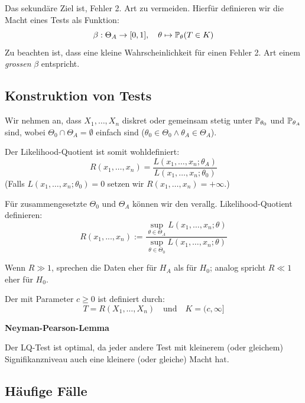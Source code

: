 Das sekundäre Ziel ist, Fehler 2. Art zu vermeiden. Hierfür definieren wir die Macht eines Tests als Funktion:
\[\beta : \Theta_A \to [0,1], \quad \theta \mapsto \P_\theta(T \in K)\]
Zu beachten ist, dass eine kleine Wahrscheinlichkeit für einen Fehler 2. Art einem \textit{grossen} \(\beta\) entspricht.

\subsection{Konstruktion von Tests}
Wir nehmen an, dass \(X_1, \ldots, X_n\) diskret oder gemeinsam stetig unter \(\P_{\theta_0}\) und \(\P_{\theta_A}\) sind, wobei \(\Theta_0 \cap \Theta_A = \emptyset\) einfach sind (\(\theta_0 \in \Theta_0 \land \theta_A \in \Theta_A\)).

\noindent Der Likelihood-Quotient ist somit wohldefiniert:
\[R(x_1, \ldots, x_n) = \frac{L(x_1,\ldots, x_n;\theta_A)}{L(x_1, \ldots, x_n;\theta_0)}\]
(Falls \(L(x_1, \ldots, x_n; \theta_0) = 0\) setzen wir \(R(x_1, \ldots, x_n) = +\infty\).) 

Für zusammengesetzte $\Theta_0$ und $\Theta_A$ können wir den verallg. Likelihood-Quotient definieren:
\[R(x_1, ..., x_n) := \frac{\sup_{\theta \in \Theta_A}L(x_1, \dots, x_n; \theta)}{\sup_{\theta \in \Theta_0}L(x_1, \dots, x_n; \theta)}\]


Wenn \(R \gg 1\), sprechen die Daten eher für \(H_A\) als für \(H_0\); analog spricht \(R \ll 1\) eher für \(H_0\).

\begin{subbox}{}
	Der  mit Parameter \(c \ge 0\) ist definiert durch:
	\[T = R(X_1, \ldots, X_n) \quad \text{und} \quad K = (c, \infty]\]
\end{subbox}
\textbf{Neyman-Pearson-Lemma}

Der LQ-Test ist optimal, da jeder andere Test mit kleinerem (oder gleichem) Signifikanzniveau auch eine kleinere (oder gleiche) Macht hat.

\subsection{Häufige Fälle}
